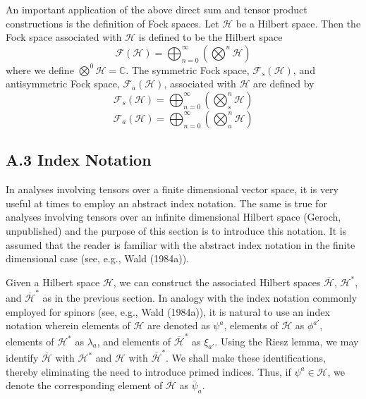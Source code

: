 \documentclass[11pt,a4paper]{article}
\begin{document}
An important application of the above direct sum and tensor product constructions is the definition of Fock spaces. Let \(\mathcal{H}\) be a Hilbert space. Then the Fock space associated with \(\mathcal{H}\) is defined to be the Hilbert space
\begin{equation*}
\mathcal{F}(\mathcal{H}) = \bigoplus_{n=0}^{\infty} \left(\bigotimes^{n} \mathcal{H}\right) \tag{A.2.7}\label{eq:A.2.7}
\end{equation*}
where we define \(\bigotimes^{0} \mathcal{H} = \mathbb{C}\). The symmetric Fock space, \(\mathcal{F}_{s}(\mathcal{H})\), and antisymmetric Fock space, \(\mathcal{F}_{a}(\mathcal{H})\), associated with \(\mathcal{H}\) are defined by
\begin{equation*}
\mathcal{F}_{s}(\mathcal{H}) = \bigoplus_{n=0}^{\infty} (\bigotimes_s^{n} \mathcal{H}) \tag{A.2.8}\label{eq:A.2.8}
\end{equation*}
\begin{equation*}
\mathcal{F}_{a}(\mathcal{H}) = \bigoplus_{n=0}^{\infty} (\bigotimes_{a}^{n} \mathcal{H}) \tag{A.2.9}\label{eq:A.2.9}
\end{equation*}

\subsection*{A.3 Index Notation}\hypertarget{sec:A.3}{}

In analyses involving tensors over a finite dimensional vector space, it is very useful at times to employ an abstract index notation. The same is true for analyses involving tensors over an infinite dimensional Hilbert space (Geroch, unpublished) and the purpose of this section is to introduce this notation. It is assumed that the reader is familiar with the abstract index notation in the \hypertarget{source-206}{} finite dimensional case (see, e.g., Wald (1984a)).

Given a Hilbert space \(\mathcal H\), we can construct the associated Hilbert spaces \(\overline{\mathcal H}\), \(\mathcal H^*\), and \(\overline{\mathcal H}^*\) as in the previous section. In analogy with the index notation commonly employed for spinors (see, e.g., Wald (1984a)), it is natural to use an index notation wherein elements of \(\mathcal H\) are denoted as \(\psi^a\), elements of \(\overline{\mathcal H}\) as \(\phi^{a'}\), elements of \(\mathcal H^*\) as \(\lambda_a\), and elements of \(\overline{\mathcal H}^*\) as \(\xi_{a'}\). Using the Riesz lemma, we may identify \(\overline{\mathcal H}\) with \(\mathcal H^*\) and \(\mathcal H\) with \(\overline{\mathcal H}^*\). We shall make these identifications, thereby eliminating the need to introduce primed indices. Thus, if \(\psi^a\in\mathcal H\), we denote the corresponding element of \(\overline{\mathcal H}\) as \(\bar\psi_a\).
\end{document}
